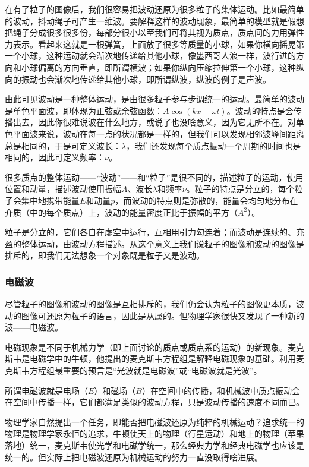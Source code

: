 在有了粒子的图像后，我们很容易把波动还原为很多粒子的集体运动。比如最简单的波动，抖动绳子可产生一维波。要解释这样的波动现象，最简单的模型就是假想把绳子分成很多很多份，每部分很小以至我们可将其视为质点，质点间的力用弹性力表示。看起来这就是一根弹簧，上面放了很多等质量的小球，如果你横向摇晃第一个小球，这种运动就会渐次地传递给其他小球，像墨西哥人浪一样，波行进的方向和小球偏离的方向垂直，即所谓横波；如果你纵向压缩拉伸第一个小球，这种纵向的振动也会渐次地传递给其他小球，即所谓纵波，纵波的例子是声波。

由此可见波动是一种整体运动，是由很多粒子参与步调统一的运动。最简单的波动是单色平面波，即体现为正弦或余弦函数：$A\cos(kx - \omega t)$。波动的特点是会传播出去，因此你很难说波在什么地方，或说了也没啥意义，因为它无所不在。对单色平面波来说，波动在每一点的状况都是一样的，但我们可以发现相邻波峰间距离总是相同的，于是可定义波长：$\lambda$，我们还发现每个质点振动一个周期的时间也是相同的，因此可定义频率：$\nu$。

很多质点的整体运动——“波动”——和“粒子”是很不同的，描述粒子的运动，使用位置和动量，描述波动使用振幅$A$、波长$\lambda$和频率$\nu$。粒子的特点是分立的，每个粒子会集中地携带能量$E$和动量$p$，而波动的特点则是弥散的，能量会均匀地分布在介质（中的每个质点）上，波动的能量密度正比于振幅的平方（$A^2$）。

粒子是分立的，它们各自在虚空中运行，互相用引力勾连着；而波动是连续的、充盈的整体运动，由波动方程描述。从这个意义上我们说粒子的图像和波动的图像是排斥的，即我们无法想象一个对象既是粒子又是波动。

\subsubsection{电磁波}

尽管粒子的图像和波动的图像是互相排斥的，我们仍会认为粒子的图像更本质，波动的图像可还原为粒子的语言，因此是从属的。但物理学家很快又发现了一种新的波——电磁波。

电磁现象是不同于机械力学（即上面讨论的质点或质点系的运动）的新现象。麦克斯韦是电磁学中的牛顿，他提出的麦克斯韦方程组是解释电磁现象的基础。利用麦克斯韦方程组最重要的预言是“光波就是电磁波”或“电磁波就是光波”。

所谓电磁波就是电场（$E$）和磁场（$B$）在空间中的传播，和机械波中质点振动会在空间中传播一样，它们都满足类似的波动方程，只是波动传播的速度不同而已。

物理学家自然提出一个任务，即能否把电磁波还原为纯粹的机械运动？追求统一的物理是物理学家永恒的追求，牛顿使天上的物理（行星运动）和地上的物理（苹果落地）统一，麦克斯韦使光学和电磁学统一，那么经典力学和经典电磁学也应该是统一的。但实际上把电磁波还原为机械运动的努力一直没取得啥进展。

